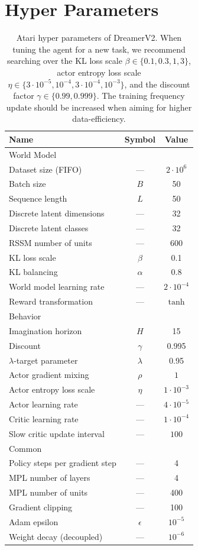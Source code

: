 \clearpage

\section{Hyper Parameters}

\begin{table}[h!]
\centering
\begin{tabular}{lcc}
\toprule
\textbf{Name} & \textbf{Symbol} & \textbf{Value} \\
\midrule
World Model \\
\midrule
Dataset size (FIFO) & --- & $2\cdot10^6$ \\
Batch size & $B$ & 50 \\
Sequence length & $L$ & 50 \\
Discrete latent dimensions & --- & 32 \\
Discrete latent classes & --- & 32 \\
RSSM number of units & --- & 600 \\
KL loss scale & $\beta$ & 0.1 \\
KL balancing & $\alpha$ & 0.8 \\
World model learning rate & --- & $2\cdot10^{-4}$ \\
Reward transformation & --- & $\operatorname{tanh}$ \\
\midrule
Behavior \\
\midrule
Imagination horizon & $H$ & 15 \\
Discount & $\gamma$ & 0.995 \\
$\lambda$-target parameter & $\lambda$ & 0.95 \\
Actor gradient mixing & $\rho$ & $1$ \\
Actor entropy loss scale & $\eta$ & $1\cdot10^{-3}$ \\
Actor learning rate & --- & $4\cdot10^{-5}$ \\
Critic learning rate & --- & $1\cdot10^{-4}$ \\
Slow critic update interval & --- & $100$ \\
\midrule
Common \\
\midrule
Policy steps per gradient step & --- & 4 \\
MPL number of layers & --- & 4 \\
MPL number of units & --- & 400 \\
Gradient clipping & --- & 100 \\
Adam epsilon & $\epsilon$ & $10^{-5}$ \\
Weight decay (decoupled) & --- & $10^{-6}$ \\
\bottomrule
\end{tabular}
\caption{Atari hyper parameters of DreamerV2. When tuning the agent for a new task, we recommend searching over the KL loss scale $\beta \in \{0.1,0.3,1,3\}$, actor entropy loss scale $\eta \in \{3\cdot10^{-5},10^{-4},3\cdot10^{-4},10^{-3}\}$, and the discount factor $\gamma \in \{0.99,0.999\}$. The training frequency update should be increased when aiming for higher data-efficiency.}
\label{tab:hparams}
\end{table}
